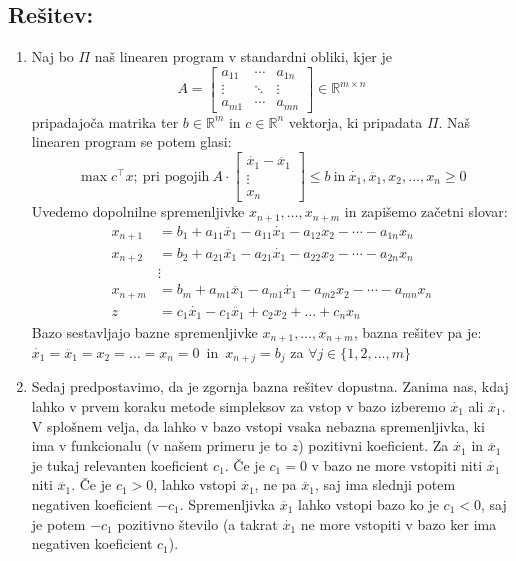 \documentclass[a4paper, 10pt]{article}
\newcommand{\mth}[1]{\ensuremath{\mathbb{#1}}}
\newcommand{\R}{\mth{R}}
\begin{document}
\subsection{Rešitev:}
\begin{enumerate}[label=(\alph*)]
	\item 
		Naj bo $\Pi$ naš linearen program v standardni obliki, kjer je \[A =  \begin{bmatrix}
			a_{11} & \cdots & a_{1n} \\
			\vdots & \ddots & \vdots \\
			a_{m1} & \cdots & a_{mn}
		\end{bmatrix} \in \R^{m \times n} \] pripadajoča matrika ter $b \in \R^{m}$ in $c \in \R^{n}$ vektorja, ki pripadata $\Pi$. Naš linearen program se potem glasi: \[ \max{c^{\top}x}; ~\text{pri pogojih}~ A \cdot \begin{bmatrix}
			\dot{x_1} - \ddot{x_1} \\
			\vdots \\
			x_n
	\end{bmatrix} \leq b ~\text{in}~ \dot{x_1}, \ddot{x_1}, x_2, \ldots, x_n \geq 0 \]
Uvedemo dopolnilne spremenljivke $x_{n+1}, \ldots, x_{n+m}$ in zapišemo začetni slovar:
\begin{align*}
	x_{n+1} &= b_1 + a_{11}\ddot{x_1} - a_{11}\dot{x_1} - a_{12}x_2 - \cdots - a_{1n}x_n \\
	x_{n+2} &= b_2 + a_{21}\ddot{x_1} - a_{21}\dot{x_1} - a_{22}x_2 - \cdots - a_{2n}x_n \\
	& \vdots\\
	x_{n+m} &= b_m + a_{m1}\ddot{x_1} - a_{m1}\dot{x_1} - a_{m2}x_2 - \cdots - a_{mn}x_n\\
	\hline
	z &= c_1\dot{x_1} - c_1\ddot{x_1} + c_2x_2 + \ldots + c_nx_n
\end{align*}
Bazo sestavljajo bazne spremenljivke $x_{n+1}, \ldots, x_{n+m}$, bazna rešitev pa je: $\dot{x_1} = \ddot{x_1} = x_2 = \ldots = x_n = 0$~in~$x_{n+j} = b_j$ za $\forall j \in \{1, 2, \ldots, m\}$
\item Sedaj predpostavimo, da je zgornja bazna rešitev dopustna. Zanima nas, kdaj lahko v prvem koraku metode simpleksov za vstop v bazo izberemo $\dot{x_1}$ ali $\ddot{x_1}$. V splošnem velja, da lahko v bazo vstopi vsaka nebazna spremenljivka, ki ima v funkcionalu (v našem primeru je to $z$) pozitivni koeficient. Za $\dot{x_1}$ in $\ddot{x_1}$ je tukaj relevanten koeficient $c_1$. Če je $c_1 = 0$ v bazo ne more vstopiti niti $\dot{x_1}$ niti $\ddot{x_1}$. Če je $c_1 > 0$, lahko vstopi $\dot{x_1}$, ne pa $\ddot{x_1}$, saj ima slednji potem negativen koeficient $-c_1$. Spremenljivka $\ddot{x_1}$ lahko vstopi bazo ko je $c_1 < 0$, saj je potem $-c_1$ pozitivno število (a takrat $\dot{x_1}$ ne more vstopiti v bazo ker ima negativen koeficient $c_1$).


\end{enumerate}
\end{document}
